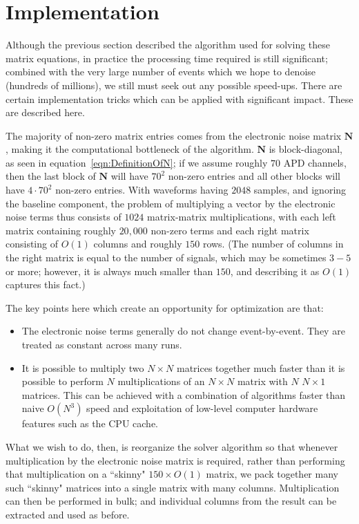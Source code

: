 \section{Implementation}

Although the previous section described the algorithm used for solving these matrix equations, in practice the processing time required is still significant; combined with the very large number of events which we hope to denoise (hundreds of millions), we still must seek out any possible speed-ups.  There are certain implementation tricks which can be applied with significant impact.  These are described here.

The majority of non-zero matrix entries comes from the electronic noise matrix $\mathbf{N}$, making it the computational bottleneck of the algorithm.  $\mathbf{N}$ is block-diagonal, as seen in equation~\ref{eqn:DefinitionOfN}; if we assume roughly $70$ APD channels, then the last block of $\mathbf{N}$ will have $70^2$ non-zero entries and all other blocks will have $4\cdot 70^2$ non-zero entries.  With waveforms having $2048$ samples, and ignoring the baseline component, the problem of multiplying a vector by the electronic noise terms thus consists of $1024$ matrix-matrix multiplications, with each left matrix containing roughly $20,000$ non-zero terms and each right matrix consisting of $O(1)$ columns and roughly $150$ rows.  (The number of columns in the right matrix is equal to the number of signals, which may be sometimes $3-5$ or more; however, it is always much smaller than $150$, and describing it as $O(1)$ captures this fact.)

The key points here which create an opportunity for optimization are that:
\begin{itemize}
\item The electronic noise terms generally do not change event-by-event.  They are treated as constant across many runs.
\item It is possible to multiply two $N \times N$ matrices together much faster than it is possible to perform $N$ multiplications of an $N \times N$ matrix with $N$ $N \times 1$ matrices.  This can be achieved with a combination of algorithms faster than naive $O(N^3)$ speed and exploitation of low-level computer hardware features such as the CPU cache.~\cite{BLASFirstReference,AnatomyOfMatrixMultiply}
\end{itemize}
What we wish to do, then, is reorganize the solver algorithm so that whenever multiplication by the electronic noise matrix is required, rather than performing that multiplication on a ``skinny" $150 \times O(1)$ matrix, we pack together many such ``skinny" matrices into a single matrix with many columns.  Multiplication can then be performed in bulk; and individual columns from the result can be extracted and used as before.

